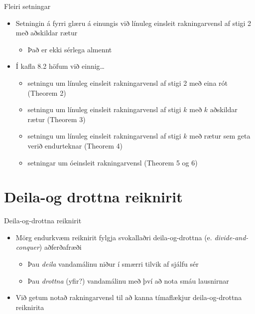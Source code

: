\documentclass[handout]{beamer}
\begin{document}
\begin{frame}{Fleiri setningar}
\begin{itemize}
 \item Setningin á fyrri glæru á einungis við línuleg einsleit rakningarvensl af stigi 2 með aðskildar rætur
 \begin{itemize}
  \item Það er ekki sérlega almennt
 \end{itemize}
 \item Í kafla 8.2 höfum við einnig\ldots
 \begin{itemize}
  \item setningu um línuleg einsleit rakningarvensl af stigi 2 með eina rót (Theorem 2)
  \item setningu um línuleg einsleit rakningarvensl af stigi $k$ með $k$ aðskildar rætur (Theorem 3)
  \item setningu um línuleg einsleit rakningarvensl af stigi $k$ með rætur sem geta verið endurteknar (Theorem 4)
  \item setningar um óeinsleit rakningarvensl (Theorem 5 og 6)
 \end{itemize}
\end{itemize}
\end{frame}

\section{Deila-og drottna reiknirit}

\begin{frame}{Deila-og-drottna reiknirit}
\begin{itemize}
 \item Mörg endurkvæm reiknirit fylgja svokallaðri deila-og-drottna (e. \emph{divide-and-conquer}) aðferðafræði
 \begin{itemize}
  \item Þau \emph{deila} vandamálinu niður í smærri tilvik af sjálfu sér
  \item Þau \emph{drottna} (yfir?) vandamálinu með því að nota smáu lausnirnar
 \end{itemize}
 \item Við getum notað rakningarvensl til að kanna tímaflækjur deila-og-drottna reiknirita
\end{itemize}
\end{frame}
\end{document}
